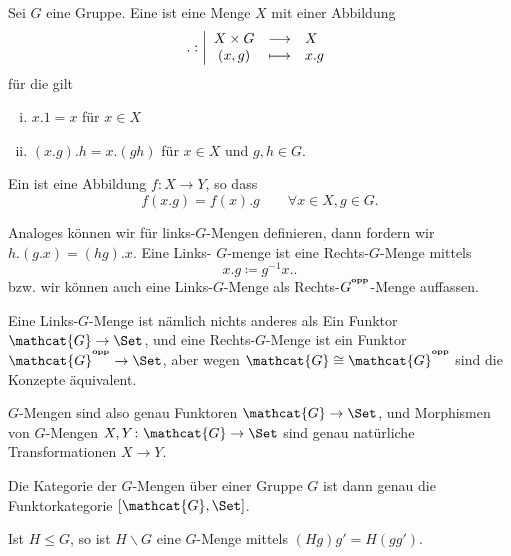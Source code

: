\begin{definition}[$G$-Menge]\label{def:g-menge}
    Sei $G$ eine Gruppe. Eine  ist eine Menge  $X$ mit einer Abbildung
        \begin{equation*}
        .: \left| \begin{array}{c c l} 
        X\times G & \longrightarrow & X \\
        (x,g) & \longmapsto &  x.g
        \end{array} \right.
    \end{equation*}
    für die gilt
    \begin{enumerate}[i)]
        \item $x.1 = x$ für  $x\in X$
        \item $(x.g).h = x.(gh)$ für  $x\in X$ und $g,h\in G$.
    \end{enumerate}
    Ein  ist eine Abbildung $f\colon X \to  Y$, so dass
\[
    f(x.g) = f(x).g \qquad \forall x\in X, g\in G
.\] 
\end{definition}

\begin{remark}
    Analoges können wir für links-$G$-Mengen definieren, dann fordern wir  $h.(g.x) = (hg).x$. Eine Links- $G$-menge ist eine Rechts-$G$-Menge mittels
     \[
    x.g \coloneqq g^{-1}x.
    .\] 
    bzw. wir können auch eine Links-$G$-Menge als Rechts-$G^{^{\operatorname{\textbf{opp}}}}$-Menge auffassen.

Eine Links-$G$-Menge ist nämlich nichts anderes als Ein Funktor  $\mathcat{G} \to  \Set$, und eine Rechts-$G$-Menge ist ein Funktor  $\mathcat{G}^{\op} \to  \Set$, aber wegen $\mathcat{G} \cong \mathcat{G}^{\op}$ sind die Konzepte äquivalent.
\end{remark}

\begin{trivial}
    $G$-Mengen sind also genau Funktoren  $\mathcat{G} \to  \Set$, und Morphismen von $G$-Mengen  $X,Y \colon  \mathcat{G} \to  \Set$ sind genau natürliche Transformationen $X \to Y$.

    Die Kategorie der $G$-Mengen über einer Gruppe  $G$ ist dann genau die Funktorkategorie  $[\mathcat{G},\Set]$.
\end{trivial}

\begin{example}
    Ist $H\leq G$, so ist $H \backslash G$ eine  $G$-Menge mittels  $(Hg)g' = H(gg')$.
\end{example}

